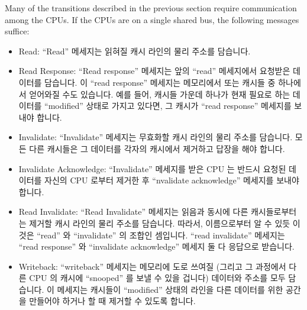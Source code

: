Many of the transitions described in the previous section require
communication among the CPUs.
If the CPUs are on a single shared bus, the following messages suffice:
\fi
\begin{itemize}
\item	Read:
	``Read'' 메세지는 읽혀질 캐시 라인의 물리 주소를 담습니다.
\item	Read Response:
	``Read response'' 메세지는 앞의 ``read'' 메세지에서 요청받은 데이터를
	담습니다.
	이 ``read response'' 메세지는 메모리에서 또는 캐시들 중 하나에서
	얻어와질 수도 있습니다.
	예를 들어, 캐시들 가운데 하나가 현재 필요로 하는 데이터를 ``modified''
	상태로 가지고 있다면, 그 캐시가 ``read response'' 메세지를 보내야
	합니다.
\item	Invalidate:
	``Invalidate'' 메세지는 무효화할 캐시 라인의 물리 주소를 담습니다.
	모든 다른 캐시들은 그 데이터를 각자의 캐시에서 제거하고 답장을 해야
	합니다.
\item	Invalidate Acknowledge:
	``Invalidate'' 메세지를 받은 CPU 는 반드시 요청된 데이터를 자신의 CPU
	로부터 제거한 후 ``nvalidate acknowledge'' 메세지를 보내야 합니다.

\item	Read Invalidate:
	``Read Invalidate'' 메세지는 읽음과 동시에 다른 캐시들로부터는 제거할
	캐시 라인의 물리 주소를 담습니다.
	따라서, 이름으로부터 알 수 있듯 이것은 ``read'' 와 ``invalidate'' 의
	조합인 셈입니다.
	``read invalidate'' 메세지는 ``read response'' 와 ``invalidate
	acknowledge'' 메세지 둘 다 응답으로 받습니다.
\item	Writeback:
	``writeback'' 메세지는 메모리에 도로 쓰여질  (그리고 그 과정에서 다른
	CPU 의 캐시에 ``snooped'' 를 보낼 수 있을 겁니다) 데이터와 주소를 모두
	담습니다.
	이 메세지는 캐시들이 ``modified'' 상태의 라인을 다른 데이터를 위한
	공간을 만들어야 하거나 할 때 제거할 수 있도록 합니다.
\iffalse


\end{itemize}
